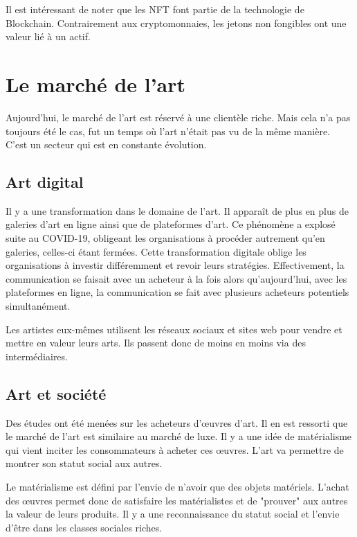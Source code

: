\documentclass[11pt]{article}
\begin{document}
Il est intéressant de noter que les NFT font partie de la technologie de Blockchain. Contrairement aux cryptomonnaies, les jetons non fongibles ont une valeur lié à un actif. \cite{dumas_10_2022} 

\section{Le marché de l'art} %
Aujourd'hui, le marché de l'art est réservé à une clientèle riche. Mais cela n'a pas toujours été le cas, fut un temps où l'art n'était pas vu de la même manière. C'est un secteur qui est en constante évolution. \cite{dumas_18_2022} 
\subsection{Art digital} %
Il y a une transformation dans le domaine de l'art. Il apparaît de plus en plus de galeries d'art en ligne ainsi que de plateformes d'art. Ce phénomène a explosé suite au COVID-19, obligeant les organisations à procéder autrement qu'en galeries, celles-ci étant fermées. Cette transformation digitale oblige les organisations à investir différemment et revoir leurs stratégies. Effectivement, la communication se faisait avec un acheteur à la fois alors qu'aujourd'hui, avec les plateformes en ligne, la communication se fait avec plusieurs acheteurs potentiels simultanément. 

Les artistes eux-mêmes utilisent les réseaux sociaux et sites web pour vendre et mettre en valeur leurs arts. Ils passent donc de moins en moins via des intermédiaires. 
\subsection{Art et société} %
Des études ont été menées sur les acheteurs d'œuvres d'art. Il en est ressorti que le marché de l'art est similaire au marché de luxe. Il y a une idée de matérialisme qui vient inciter les consommateurs à acheter ces œuvres. L'art va permettre de montrer son statut social aux autres.

Le matérialisme est défini par l'envie de n'avoir que des objets matériels. L'achat des œuvres permet donc de satisfaire les matérialistes et de "prouver" aux autres la valeur de leurs produits. Il y a une reconnaissance du statut social et l'envie d'être dans les classes sociales riches. \cite{sestino_how_2022} \cite{noauthor_nfts_nodate}
\end{document}
